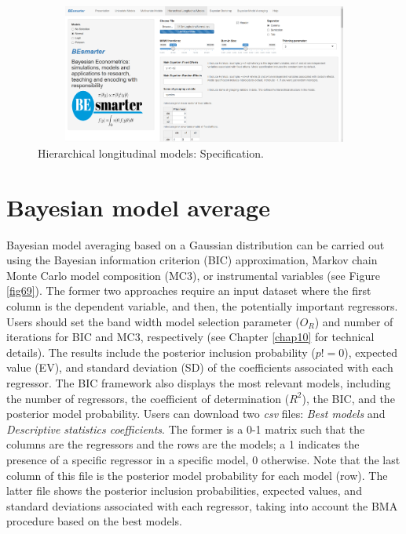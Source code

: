 \begin{figure}
	\includegraphics[width=340pt, height=130pt]{Chapters/chapterGUI/figures/Figure8.png}
	\caption[List of figure caption goes here]{Hierarchical longitudinal models: Specification.}\label{fig68}
\end{figure} 

\section{Bayesian model average}\label{secGUI6}

Bayesian model averaging based on a Gaussian distribution can be carried out using the Bayesian information criterion (BIC) approximation, Markov chain Monte Carlo model composition (MC3), or instrumental variables (see Figure \ref{fig69}). The former two approaches require an input dataset where the first column is the dependent variable, and then, the potentially important regressors.
Users should set the band width model selection parameter ($O_R$) and number of iterations for BIC and MC3, respectively (see Chapter \ref{chap10} for technical details). The results include the posterior inclusion probability ($p!=0$), expected value (EV), and standard deviation (SD) of the coefficients associated with each regressor. The BIC framework also displays the most relevant models, including the number of regressors, the coefficient of determination ($R^2$), the BIC, and the posterior model probability. Users can download two \textit{csv} files: \textit{Best models} and \textit{Descriptive statistics coefficients}. The former is a 0-1 matrix such that the columns are the regressors and the rows are the models; a 1 indicates the presence of a specific regressor in a specific model, 0 otherwise. Note that the last column of this file is the posterior model probability for each model (row). The latter file shows the posterior inclusion probabilities, expected values, and standard deviations associated with each regressor, taking into account the BMA procedure based on the best models.

